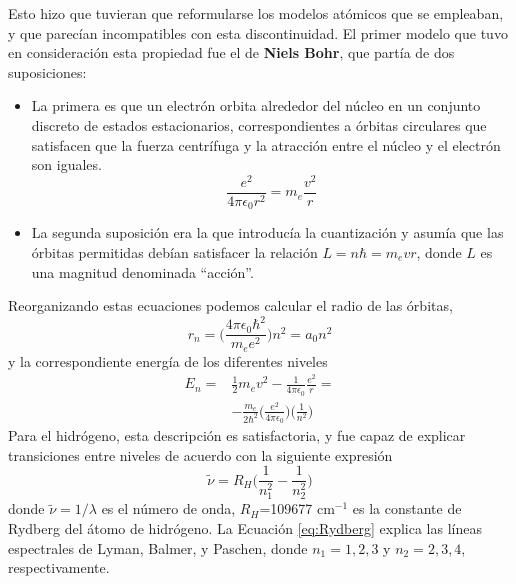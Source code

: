 Esto hizo que tuvieran que reformularse los modelos atómicos que 
se empleaban, y que parecían incompatibles con esta discontinuidad.
El primer modelo que tuvo en consideración esta propiedad fue
el de \textbf{Niels Bohr}, que partía de dos suposiciones: 
\begin{itemize}[i]
    \item La primera es que un electrón orbita alrededor del
    núcleo en un conjunto discreto de estados estacionarios, 
    correspondientes a órbitas circulares que satisfacen que la
    fuerza centrífuga y la atracción entre el núcleo y el electrón
    son iguales.
    \begin{equation}
        \frac{e^2}{4\pi \epsilon_0 r^2}=m_e\frac{v^2}{r}
    \end{equation}
    \item La segunda suposición era la que introducía la cuantización
    y asumía que las órbitas permitidas debían satisfacer la relación
    $L=n\hbar=m_evr$, donde $L$ es una magnitud denominada ``acción''.
\end{itemize}
Reorganizando estas ecuaciones podemos calcular el radio de las órbitas,
\begin{equation}
    r_n=\bigg(\frac{4\pi \epsilon_0\hbar^2}{m_ee^2}\bigg)n^2=a_0n^2    
\end{equation}
y la correspondiente energía de los diferentes niveles
\begin{equation}
    \begin{split}
    E_n= & \frac{1}{2}m_ev^2 - \frac{1}{4\pi \epsilon_0}\frac{e^2}{r}=\\
    & -\frac{m_e}{2\hbar^2}\bigg(\frac{e^2}{4\pi\epsilon_0}\bigg)\bigg(\frac{1}{n^2}\bigg)
    \end{split}
\end{equation}
Para el hidrógeno, esta descripción es satisfactoria, y fue capaz de
explicar transiciones entre niveles de acuerdo con la siguiente 
expresión
\begin{equation}
    \tilde{\nu}=R_H\bigg(\frac{1}{n^2_1} -\frac{1}{n^2_2}\bigg) 
    \label{eq:Rydberg}
\end{equation}
donde $\tilde{\nu}=1/\lambda$ es el número de onda, $R_H$=109677 cm$^{-1}$ 
es la constante de Rydberg del átomo de hidrógeno. La Ecuación 
\ref{eq:Rydberg} explica las líneas espectrales de Lyman, Balmer, 
y Paschen, donde $n_1=1,2, 3$ y $n_2=2,3,4$, respectivamente.
